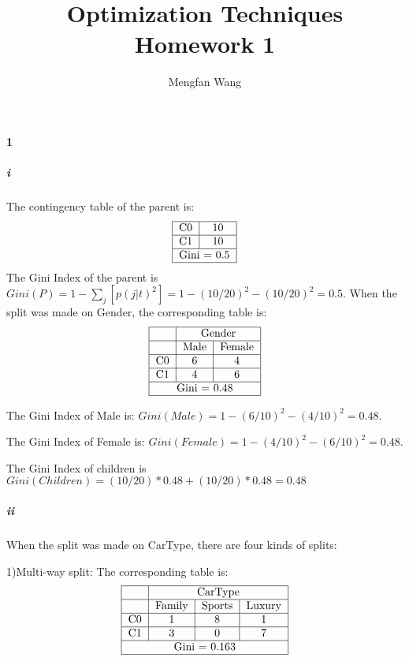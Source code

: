 \documentclass[22pt]{article}
\author{Mengfan Wang}
\title{Optimization Techniques Homework 1}
\begin{document}
	\maketitle 
	\paragraph{1}
		\subparagraph{i} The contingency table of the parent is:
		\begin{equation}
		\begin{tabular}{|c|c|}
			\hline
			 C0&10\\ 
			 \hline
			 C1&10\\  
			 \hline 
			 \multicolumn{2}{|c|}{Gini = 0.5}\\
			 \hline
		\end{tabular}
		\end{equation}
		The Gini Index of the parent is $Gini(P) = 1 - \sum_j[p(j|t)^2] = 1- (10/20)^2 - (10/20)^2 = 0.5$. When the split was made on Gender, the corresponding table is:
		\begin{equation}
		\begin{tabular}{|c|c|c|}
			\hline
			&\multicolumn{2}{c|}{Gender}\\
			\hline
			& Male & Female\\ \hline
			 C0&6&4\\ 
			 \hline
			 C1&4&6\\  
			 \hline 
			 \multicolumn{3}{|c|}{Gini = 0.48}\\
			 \hline
		\end{tabular}
		\end{equation}

		The Gini Index of Male is: $Gini(Male) = 1 - (6/10)^2-(4/10)^2 = 0.48$. 

		The Gini Index of Female is: $Gini(Female) = 1 - (4/10)^2-(6/10)^2 = 0.48$.

		The Gini Index of children is $Gini(Children) = (10/20)*0.48 + (10/20) *0.48 = 0.48$

		\subparagraph{ii} When the split was made on CarType, there are four kinds of splits:

		1)Multi-way split: The corresponding table is:
		\begin{equation}
		\begin{tabular}{|c|c|c|c|}
			\hline
			&\multicolumn{3}{c|}{CarType}\\
			\hline
			& Family & Sports & Luxury\\ \hline
			 C0&1&8&1\\ 
			 \hline
			 C1&3&0&7\\  
			 \hline 
			 \multicolumn{4}{|c|}{Gini = 0.163}\\
			 \hline
		\end{tabular}
		\end{equation}
\end{document}

